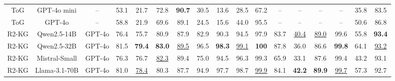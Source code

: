 \begin{table*}[tb]
{\begin{tabular}{@{}c|c|c|cccc|cccc|cccc|cc@{}}
		ToG & GPT-4o mini & --    
                                 &  53.1 & 21.7 & 72.8 & \textbf{90.7}
                                 &  30.5 & 13.6 & 28.5 & 67.2 
                                 &  --   & --   & --   & --
                                 &  35.8 & 83.5 \\
                                 
            ToG & GPT-4o & --
                                 &  58.8 & 21.9 & 69.6 & 89.1
                                 &  24.5 & 15.6 & 44.0 & 95.5 
                                 &  --   & --   & --   & --
                                 &  50.6 & 86.8 \\
            \midrule

            R2-KG & Qwen2.5-14B & GPT-4o    
                                                 &  76.4 & 75.7 & 80.9 & 87.9
                                                 &  82.9 & 90.3 & 94.5 & 97.9
                                                 &  83.7 & \underline{40.4} & \underline{89.0} & 99.6
                                                 &  55.8 & \textbf{93.4} \\

            R2-KG & Qwen2.5-32B & GPT-4o    
                                                 &  81.5 & \textbf{79.4} & \textbf{83.0} & \underline{89.5}
                                                 &  96.5 & \textbf{98.3} & \underline{99.1} & \textbf{100}
                                                 &  87.8 & 36.0 & 86.6 & \textbf{99.8}
                                                 &  64.1 & \underline{93.2} \\

            R2-KG & Mistral-Small & GPT-4o  
                                                 &  76.3 & 76.7 & \underline{82.3} & 89.4
                                                 &  75.0 & 94.5 & 96.3 & 99.3
                                                 &  65.9 & 33.1 & 87.6 & 99.4
                                                 &  43.2 & 93.1 \\
                                                 
            R2-KG & Llama-3.1-70B & GPT-4o         
                                                 &  81.0 & \underline{78.4} & 80.3 & 87.7
                                                 &  94.9 & 97.7 & 98.7 & \underline{99.9}
                                                 &  84.1 & \textbf{42.2} & \textbf{89.9} & \underline{99.7}
                                                 &  57.3 & 92.7 \\


\end{tabular}}
\end{table*}
